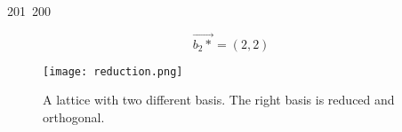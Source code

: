 201~200~\documentclass{article}
\begin{document}
\begin{enumerate}
	                                                                        	                                                                    	                                	                    	                    	                        	                        	                    \[
	                                                                        	                                                                    	                                	                    	                    	                        	                        	                    	        \Vec{b_2*} = (2,2)
	                                                                        	                                                                    	                                	                    	                    	                        	                        	                    	            \]

	                                                                        	                                                                    	                                	                    	                    	                        	                        	                    	                \begin{figure}[h]
	                                                                        	                                                                    	                                	                    	                    	                        	                        	                    	                        \centering
	                                                                        	                                                                    	                                	                    	                    	                        	                        	                    	                                \texttt{[image: reduction.png]}
	                                                                        	                                                                    	                                	                    	                    	                        	                        	                    	                                        \caption{A lattice with two different basis. The right basis is reduced and orthogonal.}
	                                                                        	                                                                    	                                	                    	                    	                        	                        	                    	                                                \label{fig:figure-1}
	                                                                        	                                                                    	                                	                    	                    	                        	                        	                    	                                                    \end{figure}


\end{enumerate}
\end{document}
